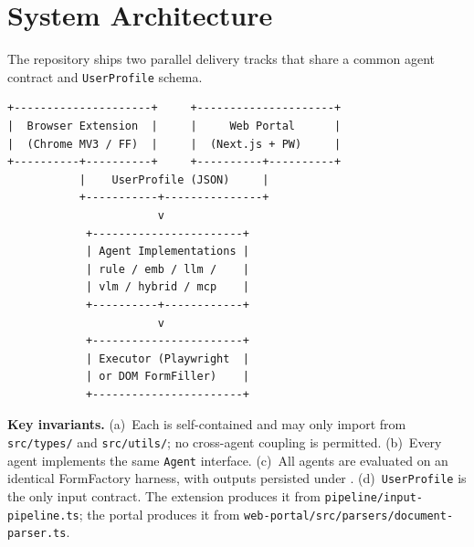 \documentclass[conference]{IEEEtran}
\begin{document}
\section{System Architecture}
The repository ships two parallel delivery tracks that share a common
agent contract and \texttt{UserProfile} schema.

\begin{lstlisting}
+---------------------+     +---------------------+
|  Browser Extension  |     |     Web Portal      |
|  (Chrome MV3 / FF)  |     |  (Next.js + PW)     |
+----------+----------+     +----------+----------+
           |    UserProfile (JSON)     |
           +-----------+---------------+
                       v
            +-----------------------+
            | Agent Implementations |
            | rule / emb / llm /    |
            | vlm / hybrid / mcp    |
            +----------+------------+
                       v
            +-----------------------+
            | Executor (Playwright  |
            | or DOM FormFiller)    |
            +-----------------------+
\end{lstlisting}

\textbf{Key invariants.} (a)~Each
 is self-contained and may
only import from \texttt{src/types/} and \texttt{src/utils/}; no
cross-agent coupling is permitted. (b)~Every agent implements the same
\texttt{Agent} interface. (c)~All agents are evaluated on an identical
FormFactory harness, with outputs persisted under
. (d)~\texttt{UserProfile} is the only
input contract. The extension produces it from
\texttt{pipeline/input-pipeline.ts}; the portal produces it from
\texttt{web-portal/src/parsers/document-parser.ts}.

\end{document}
